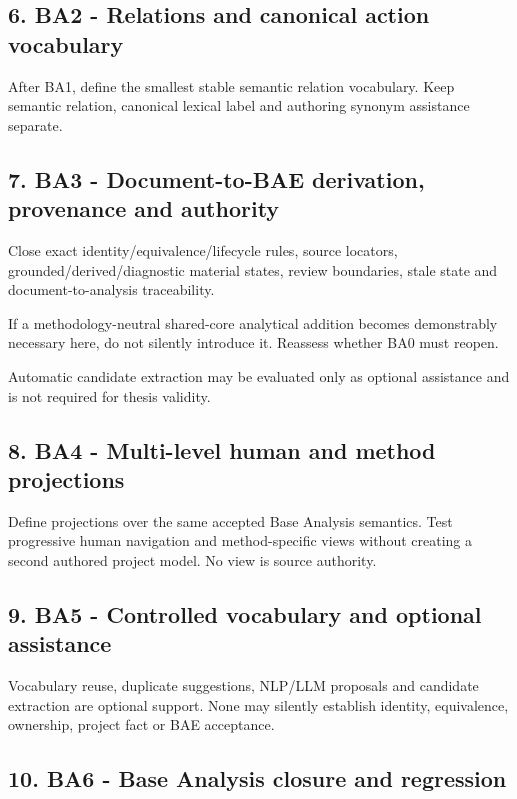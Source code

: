 \documentclass[
  10pt,
]{article}
\begin{document}
\subsection{6. BA2 - Relations and canonical action
vocabulary}\label{ba2---relations-and-canonical-action-vocabulary}

After BA1, define the smallest stable semantic relation vocabulary. Keep
semantic relation, canonical lexical label and authoring synonym
assistance separate.

\subsection{7. BA3 - Document-to-BAE derivation, provenance and
authority}\label{ba3---document-to-bae-derivation-provenance-and-authority}

Close exact identity/equivalence/lifecycle rules, source locators,
grounded/derived/diagnostic material states, review boundaries, stale
state and document-to-analysis traceability.

If a methodology-neutral shared-core analytical addition becomes
demonstrably necessary here, do not silently introduce it. Reassess
whether BA0 must reopen.

Automatic candidate extraction may be evaluated only as optional
assistance and is not required for thesis validity.

\subsection{8. BA4 - Multi-level human and method
projections}\label{ba4---multi-level-human-and-method-projections}

Define projections over the same accepted Base Analysis semantics. Test
progressive human navigation and method-specific views without creating
a second authored project model. No view is source authority.

\subsection{9. BA5 - Controlled vocabulary and optional
assistance}\label{ba5---controlled-vocabulary-and-optional-assistance}

Vocabulary reuse, duplicate suggestions, NLP/LLM proposals and candidate
extraction are optional support. None may silently establish identity,
equivalence, ownership, project fact or BAE acceptance.

\subsection{10. BA6 - Base Analysis closure and
regression}\label{ba6---base-analysis-closure-and-regression}
\end{document}
